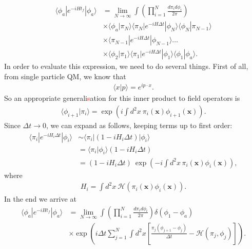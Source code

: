         \begin{align}
            \langle \phi_a| e^{- i H t_f} | \phi_a \rangle &= \lim_{N\rightarrow \infty} \int \left( \prod_{i=1}^{N} \frac{d\pi_i d\phi_i}{2\pi} \right) \nonumber \\
            &\times \langle \phi_a | \pi_N \rangle \langle \pi_N|  e^{-i H \Delta t}| \phi_N \rangle \langle \phi_N | \pi_{N-1} \rangle \nonumber \\
            &\times \langle \pi_{N-1} | e^{-i H \Delta t} | \phi_{N-1} \rangle \dots \nonumber \\
            &\times \langle \phi_2 | \pi_1 \rangle \langle \pi_1 | e^{-i H \Delta t} | \phi_1 \rangle \langle \phi_1 |\phi_a \rangle.
        \end{align}
        In order to evaluate this expression, we need to do several things. First of all, from single particle QM, we know that 
        \begin{align}
            \langle x | p \rangle = e^{i p \cdot x}.
        \end{align}
        So an appropriate generali\textcolor{red}{s}ation for this inner product to field operators is 
        \begin{align}
            \langle \phi_{i+1}| \pi_i \rangle = \exp \left(i \int d^2 x \ \pi_i(\bm{x}) \phi_{i+1}(\bm{x}) \right).
        \end{align}
        Since $\Delta t \rightarrow 0$, we can expand as follows, keeping terms up to first order:
        \begin{align}
            \langle \pi_i | e^{-i H_i \Delta t} | \phi_i \rangle &\sim \langle \pi_i | (1- i H_i \Delta t ) | \phi_i \rangle \nonumber \\
            &= \langle \pi_i | \phi_i \rangle (1 - i H_i \Delta t) \nonumber \\
            & = (1-i H_i \Delta t) \ \exp\left(-i \int d^2x \, \pi_i(\bm{x}) \phi_i (\bm{x})  \right),
        \end{align}
        where
        \begin{align}
            H_i = \int d^2 x \ \mathcal{H}\left(\pi_i (\bm{x}) \phi_i (\bm{x}) \right).
        \end{align}
        In the end we arrive at 
        \begin{align}
            \langle \phi_a | e^{-i H t_f} | \phi_a \rangle &= \lim_{N\rightarrow \infty} \int \left( \prod_{i=1}^N \frac{d \pi_i d\phi_i}{2\pi} \right) \delta \left(\phi_1 -\phi_a \right) \nonumber \\
            &\times \exp \left(i \Delta t \sum_{j=1}^{N} \int d^2x \left[\frac{\pi_j (\phi_{j+1} -\phi_j)}{\Delta t} - \mathcal{H}(\pi_j, \phi_j) \right] \right).
        \end{align}

